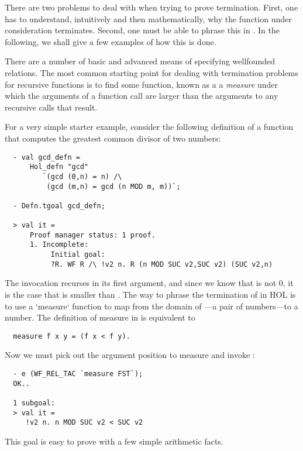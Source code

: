 There are two problems to deal with when trying to prove termination.
First, one has to understand, intuitively and then mathematically,
why the function under consideration terminates. Second, one must
be able to phrase this in \HOL. In the following, we shall give a few
examples of how this is done.

There are a number of basic and advanced means of specifying wellfounded
relations. The most common starting point for dealing with termination
problems for recursive functions is to find some function, known as a a
\emph{measure} under which the arguments of a function call are larger 
than the arguments to any recursive calls that result.

For a very simple starter example, consider the following definition
of a function that computes the greatest common divisor of two
numbers:
%
\setcounter{sessioncount}{0}
\begin{session}
\begin{hol}
\begin{verbatim}
  - val gcd_defn = 
      Hol_defn "gcd"
         `(gcd (0,n) = n) /\
          (gcd (m,n) = gcd (n MOD m, m))`;
 
  - Defn.tgoal gcd_defn;
 
  > val it =
      Proof manager status: 1 proof.
      1. Incomplete:
           Initial goal:
           ?R. WF R /\ !v2 n. R (n MOD SUC v2,SUC v2) (SUC v2,n)
\end{verbatim}
\end{hol}
\end{session}
% 
The invocation  recurses in its first argument, and 
since we know that  is not 0, it is the case that
 is smaller than \holtxt{m}. The way to phrase the 
termination of  in HOL is to use a `measure` function 
to map from the domain of \holtxt{gcd}---a pair of numbers---to a number.  
The definition of {measure} in \HOL{} is equivalent to
%
\begin{hol}
\begin{verbatim}
  measure f x y = (f x < f y).
\end{verbatim}
\end{hol}
%
Now we must pick out the argument position to measure and
invoke :
\begin{session}
\begin{hol}
\begin{verbatim}
  - e (WF_REL_TAC `measure FST`);
  OK..
 
  1 subgoal:
  > val it =
     !v2 n. n MOD SUC v2 < SUC v2
\end{verbatim}
\end{hol}
\end{session}
% 
This goal is easy to prove with a few simple arithmetic facts.

